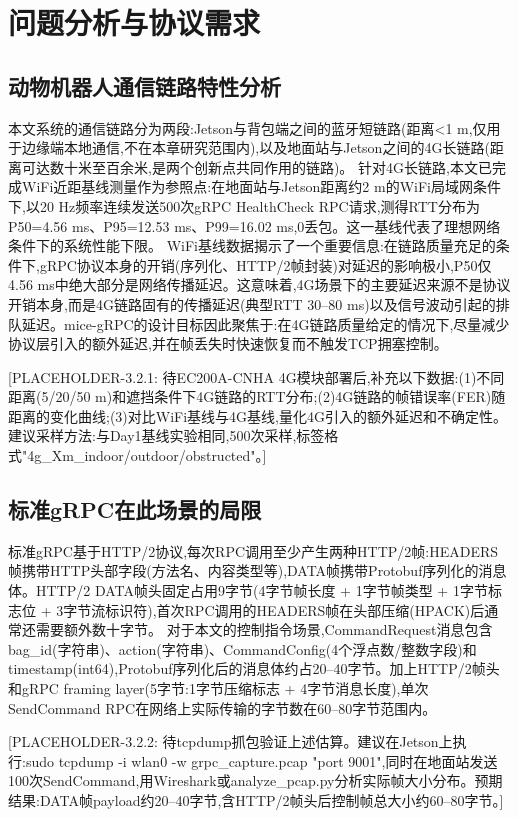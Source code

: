 \section{问题分析与协议需求}
\subsection{动物机器人通信链路特性分析}
本文系统的通信链路分为两段:Jetson与背包端之间的蓝牙短链路(距离<1 m,仅用于边缘端本地通信,不在本章研究范围内),以及地面站与Jetson之间的4G长链路(距离可达数十米至百余米,是两个创新点共同作用的链路)。
针对4G长链路,本文已完成WiFi近距基线测量作为参照点:在地面站与Jetson距离约2 m的WiFi局域网条件下,以20 Hz频率连续发送500次gRPC HealthCheck RPC请求,测得RTT分布为P50=4.56 ms、P95=12.53 ms、P99=16.02 ms,0丢包。这一基线代表了理想网络条件下的系统性能下限。
WiFi基线数据揭示了一个重要信息:在链路质量充足的条件下,gRPC协议本身的开销(序列化、HTTP/2帧封装)对延迟的影响极小,P50仅4.56 ms中绝大部分是网络传播延迟。这意味着,4G场景下的主要延迟来源不是协议开销本身,而是4G链路固有的传播延迟(典型RTT 30–80 ms)以及信号波动引起的排队延迟。mice-gRPC的设计目标因此聚焦于:在4G链路质量给定的情况下,尽量减少协议层引入的额外延迟,并在帧丢失时快速恢复而不触发TCP拥塞控制。

[PLACEHOLDER-3.2.1: 待EC200A-CNHA 4G模块部署后,补充以下数据:(1)不同距离(5/20/50 m)和遮挡条件下4G链路的RTT分布;(2)4G链路的帧错误率(FER)随距离的变化曲线;(3)对比WiFi基线与4G基线,量化4G引入的额外延迟和不确定性。建议采样方法:与Day1基线实验相同,500次采样,标签格式"4g_Xm_indoor/outdoor/obstructed"。]

\subsection{标准gRPC在此场景的局限}

标准gRPC基于HTTP/2协议,每次RPC调用至少产生两种HTTP/2帧:HEADERS帧携带HTTP头部字段(方法名、内容类型等),DATA帧携带Protobuf序列化的消息体。HTTP/2 DATA帧头固定占用9字节(4字节帧长度 + 1字节帧类型 + 1字节标志位 + 3字节流标识符),首次RPC调用的HEADERS帧在头部压缩(HPACK)后通常还需要额外数十字节。
对于本文的控制指令场景,CommandRequest消息包含bag_id(字符串)、action(字符串)、CommandConfig(4个浮点数/整数字段)和timestamp(int64),Protobuf序列化后的消息体约占20–40字节。加上HTTP/2帧头和gRPC framing layer(5字节:1字节压缩标志 + 4字节消息长度),单次SendCommand RPC在网络上实际传输的字节数在60–80字节范围内。

[PLACEHOLDER-3.2.2: 待tcpdump抓包验证上述估算。建议在Jetson上执行:sudo tcpdump -i wlan0 -w grpc_capture.pcap "port 9001",同时在地面站发送100次SendCommand,用Wireshark或analyze_pcap.py分析实际帧大小分布。预期结果:DATA帧payload约20–40字节,含HTTP/2帧头后控制帧总大小约60–80字节。]

